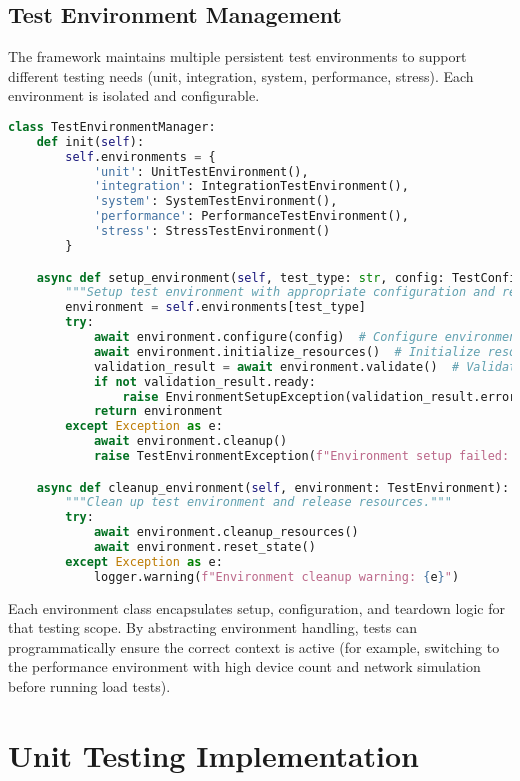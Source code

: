 \documentclass[11pt,a4paper]{report}
\begin{document}
\subsection{Test Environment Management}
The framework maintains multiple persistent test environments to support different testing needs (unit, integration, system, performance, stress). Each environment is isolated and configurable.
\begin{lstlisting}[language=Python]
class TestEnvironmentManager:
    def init(self):
        self.environments = {
            'unit': UnitTestEnvironment(),
            'integration': IntegrationTestEnvironment(),
            'system': SystemTestEnvironment(),
            'performance': PerformanceTestEnvironment(),
            'stress': StressTestEnvironment()
        }

    async def setup_environment(self, test_type: str, config: TestConfig) -> TestEnvironment:  
        """Setup test environment with appropriate configuration and resources."""  
        environment = self.environments[test_type]  
        try:  
            await environment.configure(config)  # Configure environment  
            await environment.initialize_resources()  # Initialize resources (devices, network)  
            validation_result = await environment.validate()  # Validate readiness  
            if not validation_result.ready:  
                raise EnvironmentSetupException(validation_result.errors)  
            return environment  
        except Exception as e:  
            await environment.cleanup()  
            raise TestEnvironmentException(f"Environment setup failed: {e}")

    async def cleanup_environment(self, environment: TestEnvironment):  
        """Clean up test environment and release resources."""  
        try:  
            await environment.cleanup_resources()  
            await environment.reset_state()  
        except Exception as e:  
            logger.warning(f"Environment cleanup warning: {e}")  
\end{lstlisting}
Each environment class encapsulates setup, configuration, and teardown logic for that testing scope. By abstracting environment handling, tests can programmatically ensure the correct context is active (for example, switching to the performance environment with high device count and network simulation before running load tests).
\section{Unit Testing Implementation}
\end{document}
